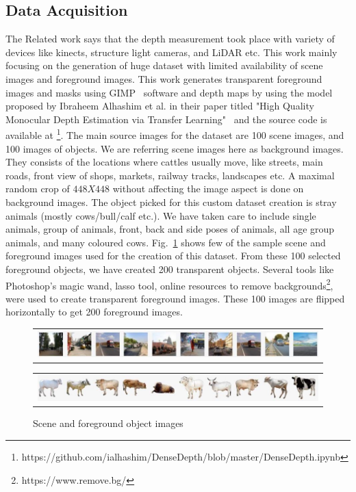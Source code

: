 \documentclass[review]{cvpr}
\begin{document}
\subsection{Data Acquisition}
The Related work says that the depth measurement took place with variety of devices like kinects, structure light cameras, and LiDAR etc. 
This work mainly focusing on the generation of huge dataset with limited availability of scene images and foreground images. 
This work generates transparent foreground images and masks using GIMP~\cite{howat2014greenland} software and 
depth maps by using the model proposed by Ibraheem Alhashim et al. in their paper titled "High Quality Monocular Depth Estimation 
via Transfer Learning"~\cite{alhashim2018high} and the source code is available 
at \footnote{https://github.com/ialhashim/DenseDepth/blob/master/DenseDepth.ipynb}. 
The main source images for the dataset are 100 scene images, and 100 images of objects. 
We are referring scene images here as background images. 
They consists of the locations where cattles usually move, like streets, main roads, front view of shops, markets, 
railway tracks, landscapes etc. A maximal random crop of $448 X 448$ without affecting the image aspect is done on 
background images. The object picked for this custom dataset creation is stray animals (mostly cows/bull/calf etc.). 
We have taken care to include single animals, group of animals, front, back and side poses of animals, 
all age group animals, and many coloured cows. 
Fig.~\ref{fig:sceneandfg} shows few of the sample scene and foreground images used for the creation of this dataset. 
From these 100 selected foreground objects, we have created 200 transparent objects. 
Several tools like Photoshop's magic wand, lasso tool, 
online resources to remove backgrounds\footnote{https://www.remove.bg/}, 
were used to create transparent foreground images. These 100 images are flipped horizontally to get 200 
foreground images. 

\begin{figure}
  \begin{center}
  \begin{tabular}{@{}c@{}}
    \includegraphics[width=0.8\linewidth]{bgimages.jpg}
  \end{tabular}
  \begin{tabular}{@{}c@{}}
      \includegraphics[width=0.8\linewidth]{fgimages.jpg}
  \end{tabular}
  \end{center}
  \caption{Scene and foreground object images}
  \label{fig:sceneandfg}
\end{figure}
\end{document}
